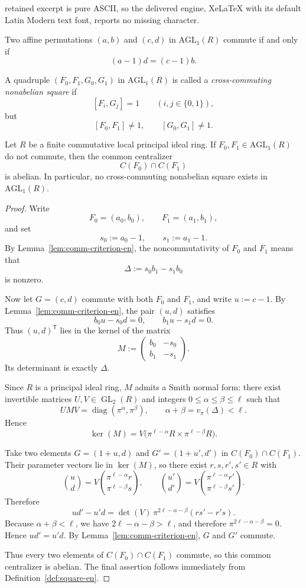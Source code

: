 \documentclass[10pt,a4paper]{amsart}
\newcommand{\AGL}{\mathrm{AGL}_1}
\newcommand{\comm}[2]{[#1,#2]}
\begin{document}
retained excerpt is pure ASCII, so the delivered engine, XeLaTeX with its default Latin Modern text font, reports no missing character.
\begin{lemma}
\label{lem:comm-criterion-en}
Two affine permutations $(a,b)$ and $(c,d)$ in $\AGL(R)$ commute if and only if
\[
(a-1)d=(c-1)b.
\]
\end{lemma}

\begin{definition}
\label{def:square-en}
A quadruple $(F_0,F_1,G_0,G_1)$ in $\AGL(R)$ is called a
\emph{cross-commuting nonabelian square} if
\[
\comm{F_i}{G_j}=1\qquad (i,j\in\{0,1\}),
\]
but
\[
\comm{F_0}{F_1}\ne 1,\qquad \comm{G_0}{G_1}\ne 1.
\]
\end{definition}

\begin{theorem}
\label{thm:local-obstruction-en}
Let $R$ be a finite commutative local principal ideal ring. If
$F_0,F_1\in\AGL(R)$ do not commute, then the common centralizer
\[
C(F_0)\cap C(F_1)
\]
is abelian. In particular, no cross-commuting nonabelian square exists in
$\AGL(R)$.
\end{theorem}

\begin{proof}
Write
\[
F_0=(a_0,b_0),\qquad F_1=(a_1,b_1),
\]
and set
\[
s_0:=a_0-1,\qquad s_1:=a_1-1.
\]
By Lemma~\ref{lem:comm-criterion-en}, the noncommutativity of $F_0$ and $F_1$
means that
\[
\Delta:=s_0b_1-s_1b_0
\]
is nonzero.

Now let $G=(c,d)$ commute with both $F_0$ and $F_1$, and write $u:=c-1$. By
Lemma~\ref{lem:comm-criterion-en}, the pair $(u,d)$ satisfies
\[
b_0u-s_0d=0,\qquad b_1u-s_1d=0.
\]
Thus $(u,d)^{\mathsf T}$ lies in the kernel of the matrix
\[
M:=
\begin{pmatrix}
b_0 & -s_0\\
b_1 & -s_1
\end{pmatrix}.
\]
Its determinant is exactly $\Delta$.

Since $R$ is a principal ideal ring, $M$ admits a Smith normal form:
there exist invertible matrices $U,V\in \operatorname{GL}_2(R)$ and integers
$0\le \alpha\le \beta\le \ell$ such that
\[
UMV=\operatorname{diag}(\pi^\alpha,\pi^\beta),
\qquad
\alpha+\beta=v_\pi(\Delta)<\ell.
\]
Hence
\[
\ker(M)=V\bigl(\pi^{\ell-\alpha}R\times \pi^{\ell-\beta}R\bigr).
\]

Take two elements $G=(1+u,d)$ and $G'=(1+u',d')$ in $C(F_0)\cap C(F_1)$. Their
parameter vectors lie in $\ker(M)$, so there exist $r,s,r',s'\in R$ with
\[
\binom{u}{d}
=
V\binom{\pi^{\ell-\alpha}r}{\pi^{\ell-\beta}s},
\qquad
\binom{u'}{d'}
=
V\binom{\pi^{\ell-\alpha}r'}{\pi^{\ell-\beta}s'}.
\]
Therefore
\[
ud'-u'd
=
\det(V)\,\pi^{2\ell-\alpha-\beta}(rs'-r's).
\]
Because $\alpha+\beta<\ell$, we have $2\ell-\alpha-\beta>\ell$, and therefore
$\pi^{2\ell-\alpha-\beta}=0$. Hence $ud'=u'd$. By
Lemma~\ref{lem:comm-criterion-en}, $G$ and $G'$ commute.

Thus every two elements of $C(F_0)\cap C(F_1)$ commute, so this common
centralizer is abelian. The final assertion follows immediately from
Definition~\ref{def:square-en}.
\end{proof}
\end{document}
